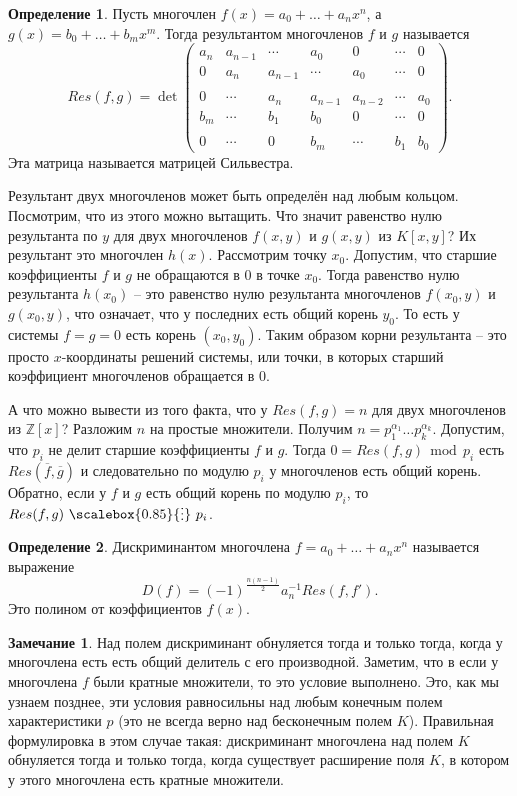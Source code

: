 \documentclass[12pt,a4paper,oneside]{book}
\theoremstyle{definition}
\newtheorem*{rem}{\color{green!50!blue}Замечание}
\newtheorem*{defn}{\color{yellow!30!red} Определение}
\renewcommand{\mod}{\,\operatorname{mod}\,}
\newcommand{\ovl}{\overline}
\newcommand{\di}{\mathop{\,\scalebox{0.85}{\raisebox{-1.2pt}[0.5\height]{\vdots}}\,}}
\newcommand{\Z}{\mathbb Z}
\def\dfn{\begin{defn}}
\def\edfn{\end{defn}}
\def\rm{\begin{rem}}
\def\erm{\end{rem}}
\begin{document}
\dfn Пусть многочлен $f(x)=a_0+\dots+a_nx^n$, а $g(x)=b_0+\dots+b_mx^m$. Тогда результантом многочленов $f$ и $g$ называется $$Res(f,g)=  \det 
\begin{pmatrix}
a_n & a_{n-1} & \cdots & a_0 & 0 & \cdots & 0 \\
0 & a_n & a_{n-1} & \cdots & a_0 & \cdots & 0 \\
\\
0 & \cdots &  a_n & a_{n-1} & a_{n-2} & \cdots &  a_0 \\
b_m & \cdots & b_1 & b_0 & 0 & \cdots & 0 \\
 \\
0 & \cdots & 0 & b_m & \cdots & b_1 & b_0 
\end{pmatrix}.$$
Эта матрица называется матрицей Сильвестра. 
\edfn

Результант двух многочленов может быть определён над любым кольцом. Посмотрим, что из этого можно вытащить. Что значит равенство нулю результанта по $y$ для двух многочленов $f(x,y) $ и $g(x,y)$ из $K[x,y]$? Их результант это многочлен $h(x)$. Рассмотрим точку $x_0$. Допустим, что старшие коэффициенты $f$ и $g$ не обращаются в 0 в точке $x_0$. Тогда равенство нулю результанта $h(x_0)$ -- это равенство нулю результанта многочленов $f(x_0,y)$ и $g(x_0,y)$, что означает, что у последних есть общий корень $y_0$. То есть у системы $f=g=0$ есть корень $(x_0,y_0)$. Таким образом корни результанта -- это  просто $x$-координаты решений системы, или точки, в которых старший коэффициент многочленов обращается в 0.


А что можно вывести из того факта, что у $Res(f,g)=n$ для двух многочленов из $\Z[x]$? Разложим $n$ на простые множители. Получим $n=p_1^{\alpha_1} \dots p_k^{\alpha_k}$. Допустим, что $p_i$ не делит старшие коэффициенты $f$ и $g$. Тогда $0=Res(f,g) \mod p_i $ есть $Res(\ovl{f}, \ovl{g})$ и следовательно по модулю $p_i$ у многочленов есть общий корень. Обратно, если у $f$ и $g$ есть общий корень по модулю $p_i$, то $Res(f,g)\di p_i$.

\dfn Дискриминантом многочлена $f=a_0+\dots +a_nx^n$ называется выражение 
$$D(f)=(-1)^{\frac{n(n-1)}{2}} a_n^{-1} Res(f,f').$$
Это полином от коэффициентов $f(x)$.
\edfn

\rm Над полем  дискриминант обнуляется тогда и только тогда, когда у многочлена есть есть общий делитель с его производной. Заметим, что в если у многочлена $f$ были кратные множители, то это условие выполнено. Это, как мы узнаем позднее, эти условия равносильны над любым конечным полем характеристики $p$ (это не всегда верно над бесконечным полем $K$). Правильная формулировка в этом случае такая: дискриминант многочлена над полем $K$ обнуляется тогда и только тогда, когда существует расширение поля $K$, в котором у этого многочлена есть кратные множители.  
\erm
\end{document}
